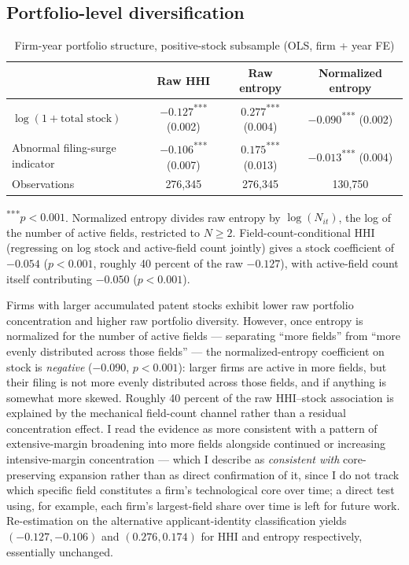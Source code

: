 \documentclass[12pt]{article}
\begin{document}
\subsection{Portfolio-level diversification}

\begin{table}[htbp]
\centering
\small
\caption{Firm-year portfolio structure, positive-stock subsample (OLS, firm + year FE)}
\label{tab:block1b}
\begin{tabular}{lccc}
\toprule
 & Raw HHI & Raw entropy & Normalized entropy \\
\midrule
$\log(1+\text{total stock})$ & $-0.127$\textsuperscript{***} (0.002) & $0.277$\textsuperscript{***} (0.004) & $-0.090$\textsuperscript{***} (0.002) \\
Abnormal filing-surge indicator & $-0.106$\textsuperscript{***} (0.007) & $0.175$\textsuperscript{***} (0.013) & $-0.013$\textsuperscript{***} (0.004) \\
\midrule
Observations & 276,345 & 276,345 & 130,750 \\
\bottomrule
\end{tabular}
\begin{minipage}{\textwidth}
\vspace{2pt}
\footnotesize \textsuperscript{***}$p<0.001$. Normalized entropy divides raw entropy by $\log(N_{it})$, the log of the number of active fields, restricted to $N\geq2$. Field-count-conditional HHI (regressing on log stock and active-field count jointly) gives a stock coefficient of $-0.054$ ($p<0.001$, roughly 40 percent of the raw $-0.127$), with active-field count itself contributing $-0.050$ ($p<0.001$).
\end{minipage}
\end{table}

Firms with larger accumulated patent stocks exhibit lower raw portfolio concentration and higher raw portfolio diversity. However, once entropy is normalized for the number of active fields --- separating ``more fields'' from ``more evenly distributed across those fields'' --- the normalized-entropy coefficient on stock is \emph{negative} ($-0.090$, $p<0.001$): larger firms are active in more fields, but their filing is not more evenly distributed across those fields, and if anything is somewhat more skewed. Roughly 40 percent of the raw HHI--stock association is explained by the mechanical field-count channel rather than a residual concentration effect. I read the evidence as more consistent with a pattern of extensive-margin broadening into more fields alongside continued or increasing intensive-margin concentration --- which I describe as \emph{consistent with} core-preserving expansion rather than as direct confirmation of it, since I do not track which specific field constitutes a firm's technological core over time; a direct test using, for example, each firm's largest-field share over time is left for future work. Re-estimation on the alternative applicant-identity classification yields $(-0.127,-0.106)$ and $(0.276,0.174)$ for HHI and entropy respectively, essentially unchanged.
\end{document}
